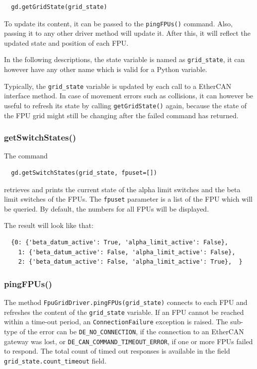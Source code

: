 \documentclass[11pt,a4paper]{scrartcl}
\begin{document}
\begin{verbatim}
  gd.getGridState(grid_state)
\end{verbatim}

To update its content, it can be passed to the \texttt{pingFPUs()}
command. Also, passing it to any other driver method will update
it. After this, it will reflect the updated state and position of each
FPU.

In the following descriptions, the state variable is named as
\texttt{grid\_state}, it can however have any other name which is
valid for a Python variable.

Typically, the \texttt{grid\_state} variable is updated by each call
to a EtherCAN interface method. In case of movement errors such as collisions, it
can however be useful to refresh its state by calling
\texttt{getGridState()} again, because the state of the FPU grid might
still be changing after the failed command has returned.

\subsubsection{getSwitchStates()}

The command
\begin{verbatim}
  gd.getSwitchStates(grid_state, fpuset=[])
\end{verbatim}
retrieves and prints the current state of the alpha limit switches
and the beta limit switches of the FPUs.  The \texttt{fpuset}
parameter is a list of the FPU which will be queried. By default, the
numbers for all FPUs will be displayed.

The result will look like that:
\begin{verbatim}
  {0: {'beta_datum_active': True, 'alpha_limit_active': False},
    1: {'beta_datum_active': False, 'alpha_limit_active': False},
    2: {'beta_datum_active': False, 'alpha_limit_active': True},  }
\end{verbatim}




\subsubsection{pingFPUs()}
\begin{sloppypar}
  The method
\texttt{FpuGridDriver.pingFPUs(grid\_state)} connects to each FPU and
refreshes the content of the \texttt{grid\_state} variable. If an FPU
cannot be reached within a time-out period, an
\texttt{ConnectionFailure} exception is raised. The sub-type of the
error can be \texttt{DE\_NO\_CONNECTION}, if the connection to an
EtherCAN gateway was lost, or
\texttt{DE\_CAN\_COMMAND\_TIMEOUT\_ERROR}, if one or more FPUs failed
to respond. The total count of timed out responses is available in the
field \texttt{grid\_state.count\_timeout} field.
\end{sloppypar}
\end{document}

